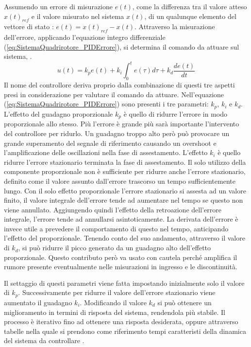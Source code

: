 Assumendo un errore di misurazione $e(t)$, come la differenza tra il valore atteso $x(t)_{ref}$ e il valore misurato nel sistema $x(t)$, di un qualunque elemento del vettore di stato : $e(t)=x(t)_{ref}-x(t)$. Attraverso la misurazione dell'errore, applicando l'equazione integro differenziale (\ref{eq:SistemaQuadrirotore_PIDErrore}), si determina il comando da attuare sul sistema, \cite{advanced-pid-control}.
\begin{equation}\label{eq:SistemaQuadrirotore_PIDErrore}
	u(t) = k_p e(t) + k_i \int_0^t e(\tau) d\tau + k_d \frac{d e(t)}{d t}
\end{equation}
Il nome del controllore deriva proprio dalla combinazione di questi tre aspetti presi in considerazione per valutare il comando da attuare.
Nell'equazione (\ref{eq:SistemaQuadrirotore_PIDErrore}) sono presenti i tre parametri: $k_p$, $k_i$ e $k_d$.
L'effetto del guadagno proporzionale $k_p$ è quello di ridurre l'errore in modo proporzionale allo stesso. Più l'errore è grande più sarà importante l'intervento del controllore per ridurlo. Un guadagno troppo alto però può provocare un grande superamento del segnale di riferimento causando un overshoot e l'amplificazione delle oscillazioni nella fase di assestamento.
L'effetto $k_i$ è quello ridurre l'errore stazionario terminata la fase di assestamento. Il solo utilizzo della componente proporzionale non è sufficiente per ridurre anche l'errore stazionario, definito come il valore assunto dall'errore trascorso un tempo sufficientemente lungo. Con il solo effetto proporzionale l'errore stazionario si assesta ad un valore finito, il valore integrale dell'errore tende ad aumentare nel tempo se questo non viene annullato. Aggiungendo quindi l'effetto della retroazione dell'errore integrale, l'errore tende ad annullarsi asintoticamente.
La derivata dell'errore è invece utile a prevedere il comportamento di questo nel tempo, anticipando l'effetto del proporzionale. Tenendo conto del suo andamento, attraverso il valore di $k_d$, si può ridurre il picco generato da un guadagno alto dell'effetto proporzionale. Questo contributo però va usato con cautela perché amplifica il rumore presente eventualmente nelle misurazioni in ingresso e le discontinuità.

Il settaggio di questi parametri viene fatta impostando inizialmente solo il valore di $k_p$. Successivamente per ridurre il valore dell'errore stazionario viene aumentato il guadagno $k_i$. Modificando il valore $k_d$ si può ottenere un miglioramento in termini di risposta del sistema, rendendola più stabile. Il processo è iterativo fino ad ottenere una risposta desiderata, oppure attraverso tabelle nella quale si prendono come riferimento tempi caratteristi della dinamica del sistema da controllare \cite{advanced-pid-control}.


